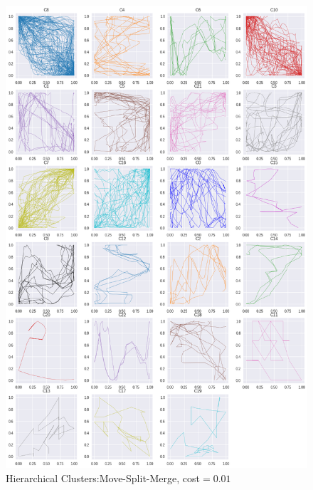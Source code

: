 \begin{figure}[h]
  \centering
  \includegraphics[width=\linewidth,height=\textheight,keepaspectratio]{figs/clusters/CLU_H_ALL[MSM;c=.01].png}
  \caption{ Hierarchical Clusters:Move-Split-Merge, cost$=0.01$}
\end{figure}

